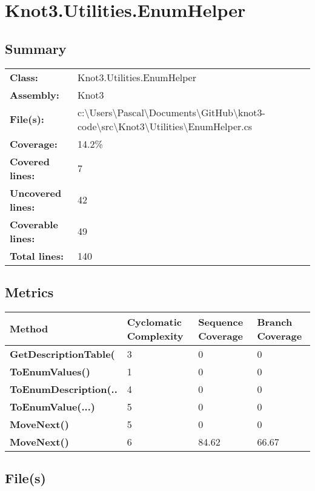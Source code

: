 \documentclass[a4paper,10pt]{article}
\begin{document}
\section{Knot3.Utilities.EnumHelper}
\subsection{Summary}
\begin{longtable}[l]{ll}
\textbf{Class:} & Knot3.Utilities.EnumHelper\\
\textbf{Assembly:} & Knot3\\
\textbf{File(s):} & \begin{minipage}[t]{12cm}{c:\textbackslash Users\textbackslash Pascal\textbackslash Documents\textbackslash GitHub\textbackslash knot3-code\textbackslash src\textbackslash Knot3\textbackslash Utilities\textbackslash EnumHelper.cs}\end{minipage} \\
\textbf{Coverage:} & 14.2\%\\
\textbf{Covered lines:} & 7\\
\textbf{Uncovered lines:} & 42\\
\textbf{Coverable lines:} & 49\\
\textbf{Total lines:} & 140\\
\end{longtable}
\subsection{Metrics}
\begin{longtable}[l]{|l|l|l|l|}
\hline
\textbf{Method} & \textbf{Cyclomatic Complexity} & \textbf{Sequence Coverage} & \textbf{Branch Coverage}\\
\hline
\textbf{GetDescriptionTable(} & 3 & 0 & 0\\
\hline
\textbf{ToEnumValues()} & 1 & 0 & 0\\
\hline
\textbf{ToEnumDescription(..} & 4 & 0 & 0\\
\hline
\textbf{ToEnumValue(...)} & 5 & 0 & 0\\
\hline
\textbf{MoveNext()} & 5 & 0 & 0\\
\hline
\textbf{MoveNext()} & 6 & 84.62 & 66.67\\
\hline
\end{longtable}
\subsection{File(s)}
\end{document}
